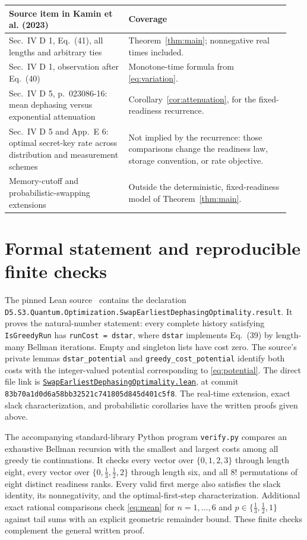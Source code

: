 \documentclass[11pt,a4paper]{article}
\begin{document}
\begin{center}
\small
\begin{tabular}{@{}p{0.40\linewidth}p{0.54\linewidth}@{}}
\toprule
Source item in Kamin et al. (2023)&Coverage\\
\midrule
Sec.~IV D 1, Eq.~(41), all lengths and arbitrary ties &
Theorem~\ref{thm:main}; nonnegative real times included.\\[3pt]
Sec.~IV D 1, observation after Eq.~(40)&
Monotone-time formula from \eqref{eq:variation}.\\[3pt]
Sec.~IV D 5, p.~023086-16: mean dephasing versus exponential attenuation&
Corollary~\ref{cor:attenuation}, for the fixed-readiness recurrence.\\[3pt]
Sec.~IV D 5 and App.~E 6: optimal secret-key rate across distribution and measurement schemes&
Not implied by the recurrence: those comparisons change the readiness law,
storage convention, or rate objective.\\[3pt]
Memory-cutoff and probabilistic-swapping extensions&
Outside the deterministic, fixed-readiness model of Theorem~\ref{thm:main}.\\
\bottomrule
\end{tabular}
\end{center}

\section{Formal statement and reproducible finite checks}
The pinned Lean source~\cite{lean} contains the declaration
\nolinkurl{D5.S3.Quantum.Optimization.SwapEarliestDephasingOptimality.result}.
It proves the natural-number statement: every complete history satisfying
\texttt{IsGreedyRun} has \texttt{runCost = dstar}, where \texttt{dstar}
implements Eq.~(39) by length-many Bellman iterations. Empty and singleton
lists have cost zero. The source's private lemmas
\texttt{dstar\_potential} and \texttt{greedy\_cost\_potential} identify
both costs with the integer-valued potential corresponding to
\eqref{eq:potential}. The direct file link is
\href{https://github.com/the-omega-institute/trureturing/blob/83b70a1d0d6a58bb32521c741805d845d401c5f8/D5/S3/Quantum/Optimization/SwapEarliestDephasingOptimality.lean}{\texttt{SwapEarliestDephasingOptimality.lean}}, at commit
\nolinkurl{83b70a1d0d6a58bb32521c741805d845d401c5f8}.
The real-time extension, exact slack characterization, and probabilistic
corollaries have the written proofs given above.

The accompanying standard-library Python program \texttt{verify.py}
compares an exhaustive Bellman recursion with the smallest and largest
costs among all greedy tie continuations. It checks every vector over
$\{0,1,2,3\}$ through length eight, every vector over
$\{0,\tfrac13,\tfrac12,2\}$ through length six, and all $8!$ permutations
of eight distinct readiness ranks. Every valid first merge also satisfies
the slack identity, its nonnegativity, and the optimal-first-step
characterization. Additional exact rational comparisons check
\eqref{eq:mean} for $n=1,\ldots,6$ and $p\in\{\tfrac13,\tfrac12,1\}$
against tail sums with an explicit geometric remainder bound.
These finite checks complement the general written proof.
\end{document}
